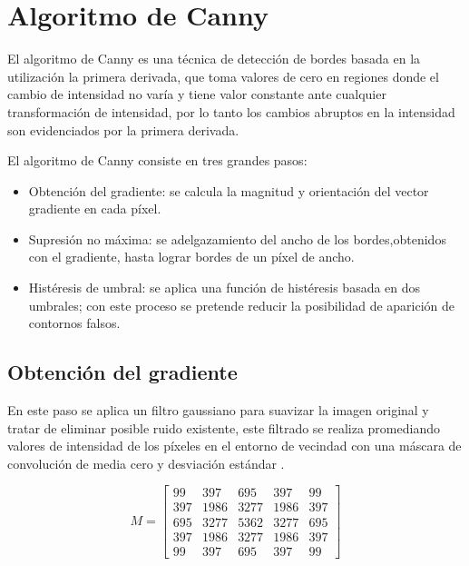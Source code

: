 \section{Algoritmo de Canny}

El algoritmo de Canny es una técnica de detección de bordes basada en la utilización la primera derivada, que toma
valores de cero en regiones donde el cambio de intensidad no varía y tiene valor constante ante cualquier transformación
de intensidad, por lo tanto los cambios abruptos en la intensidad son evidenciados por la primera derivada.

El algoritmo de Canny consiste en tres grandes pasos: 

\begin{itemize}
\item Obtención del gradiente: se calcula la magnitud y orientación del vector gradiente en cada píxel. 
\item Supresión no máxima: se adelgazamiento del ancho de los bordes,obtenidos con el gradiente, hasta lograr bordes de
un píxel de ancho. 
\item Histéresis de umbral: se aplica una función de histéresis basada en dos umbrales; con este proceso se pretende
reducir la posibilidad de aparición de contornos falsos. 
\end{itemize}

\subsection{Obtención del gradiente}

En este paso se aplica un filtro gaussiano para suavizar la imagen original y tratar de eliminar posible ruido existente,
este filtrado se realiza promediando valores de intensidad de los píxeles en el entorno de vecindad con una 
máscara de convolución de media cero y desviación estándar \sigma.

\begin{equation}
M =\begin{bmatrix}
99 & 397 & 695 & 397 & 99 \\ 
397 & 1986 & 3277 & 1986 & 397 \\ 
695 & 3277 & 5362 & 3277 & 695 \\ 
397 & 1986 & 3277 & 1986 & 397 \\ 
99 & 397 & 695 & 397 & 99
\end{bmatrix}
\end{equation}

